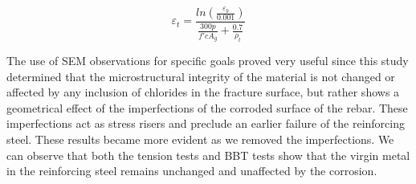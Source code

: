 \begin{equation}
    \varepsilon_{t}=\frac{ln(\frac{\varepsilon_{b}}{0.001})}{\frac{300p}{f'c A_{g}}+\frac{0.7}{\rho_{t}}}
    \label{eq.BarFracture}
\end{equation}

The use of SEM observations for specific goals proved very useful since this study determined that the microstructural integrity of the material is not changed or affected by any inclusion of chlorides in the fracture surface, but rather shows a geometrical effect of the imperfections of the corroded surface of the rebar. These imperfections act as stress risers and preclude an earlier failure of the reinforcing steel. These results became more evident as we removed the imperfections. We can observe that both the tension tests and BBT tests show that the virgin metal in the reinforcing steel remains unchanged and unaffected by the corrosion.



